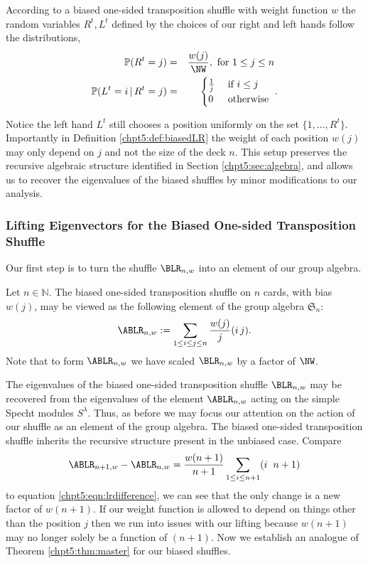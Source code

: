 \documentclass[11pt]{report}
\begin{document}
According to a biased one-sided transposition shuffle with weight function $w$ the random variables $R^{t}, L^{t}$ defined by the choices of our right and left hands follow the distributions,
\begin{eqnarray}
\mathbb{P}(R^{t}=j) & = &\frac{w(j)}{\NW}, \text{ for } 1 \leq j 
\leq n\ \\
\mathbb{P}(L^{t}=i \, | \, R^{t}=j) & = &\begin{cases}
\frac{1}{j} & \textnormal{ if } i \leq j \\
0 & \textnormal{ otherwise }
\end{cases}.
\end{eqnarray}

Notice the left hand $L^{t}$ still chooses a position uniformly on the set $\{1,\ldots,R^{t}\}$. Importantly in Definition \ref{chpt5:def:biasedLR} the weight of each position $w(j)$ may only 
depend on $j$ and not the size of the deck $n$. 
This setup preserves the recursive algebraic structure identified in Section \ref{chpt5:sec:algebra}, and allows us to recover the eigenvalues of the biased shuffles by minor modifications to our analysis. 

\subsubsection{Lifting Eigenvectors for the Biased One-sided Transposition Shuffle}
Our first step is to turn the shuffle $\BLR_{n,w}$ into an element of our group algebra.

\begin{defn}
	\label{chpt5:def:BLRop}
	Let $n \in \mathbb{N}$.	The biased one-sided transposition shuffle on $n$ cards, with bias $w(j)$, may be viewed as the following element of the group algebra $\mathfrak{S}_n$:
	\begin{eqnarray}
	\ABLR_{n,w}:= \sum_{1 \leq i \leq j \leq n}\frac{w(j)}{j} (i\,j) .
	\label{chpt5:eqn:biasedalgebrashuffle}
	\end{eqnarray}
	Note that to form $\ABLR_{n,w}$ we have scaled $\BLR_{n,w}$ by a factor of $\NW$.
\end{defn}

The eigenvalues of the biased one-sided transposition shuffle $\BLR_{n,w}$ may be recovered from the eigenvalues of the element $\ABLR_{n,w}$ acting on the simple Specht modules $S^{\lambda}$. Thus, as before we may focus our attention on the action of our shuffle as an element of the group algebra. The biased one-sided transposition shuffle inherits the recursive structure present in the unbiased case. Compare 
\begin{eqnarray}
\ABLR_{n+1,w} - \ABLR_{n,w} = \frac{w(n+1)}{n+1} \sum_{1\leq i \leq n+1} (i \hspace{0.2cm} n+1) \label{chpt5:eqn:biasedcompare}
\end{eqnarray}
to equation \eqref{chpt5:eqn:lrdifference}, we can see that the only change is a new factor of $w(n+1)$. If our weight function is allowed to depend on things other than the position $j$ then we run into issues with our lifting because $w(n+1)$ may no longer solely be a function of $(n+1)$.  Now we establish an analogue of Theorem \ref{chpt5:thm:master} for our biased shuffles.
\end{document}

